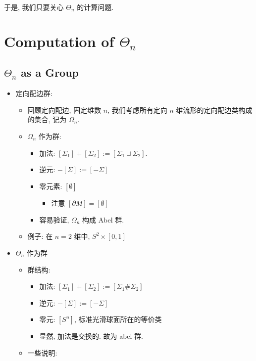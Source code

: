 \documentclass[
]{ctexart}
\providecommand{\tightlist}{%
  \setlength{\itemsep}{0pt}\setlength{\parskip}{0pt}}
\begin{document}
于是, 我们只要关心 \(\Theta_n\) 的计算问题.

\section{\texorpdfstring{Computation of
\(\Theta_n\)}{Computation of \textbackslash Theta\_n}}\label{computation-of-theta_n}

\subsection{\texorpdfstring{\(\Theta_n\) as a
Group}{\textbackslash Theta\_n as a Group}}\label{theta_n-as-a-group}

\begin{itemize}
\tightlist
\item
  定向配边群:

  \begin{itemize}
  \tightlist
  \item
    回顾定向配边, 固定维数 \(n\), 我们考虑所有定向 \(n\)
    维流形的定向配边类构成的集合, 记为 \(\Omega_n\).
  \item
    \(\Omega_n\) 作为群:

    \begin{itemize}
    \tightlist
    \item
      加法: \([\Sigma_1]+[\Sigma_2]:=[\Sigma_1\sqcup\Sigma_2]\).
    \item
      逆元: \(-[\Sigma]:=[-\Sigma]\)
    \item
      零元素: \([\emptyset]\)

      \begin{itemize}
      \tightlist
      \item
        注意 \([\partial M]=[\emptyset]\)
      \end{itemize}
    \item
      容易验证, \(\Omega_n\) 构成 Abel 群.
    \end{itemize}
  \item
    例子: 在 \(n=2\) 维中, \(S^2\times[0,1]\)
  \end{itemize}
\item
  \(\Theta_n\) 作为群

  \begin{itemize}
  \tightlist
  \item
    群结构:

    \begin{itemize}
    \tightlist
    \item
      加法: \([\Sigma_1]+[\Sigma_2]:=[\Sigma_1\# \Sigma_2]\)
    \item
      逆元: \(-[\Sigma]:=[-\Sigma]\)
    \item
      零元: \([S^n]\), 标准光滑球面所在的等价类
    \item
      显然, 加法是交换的. 故为 abel 群.
    \end{itemize}
  \item
    一些说明:


\end{itemize}
\end{itemize}
\end{document}
